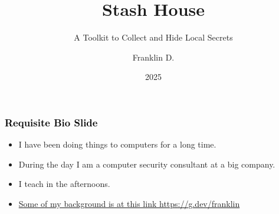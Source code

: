 \documentclass[aspectratio=169]{beamer}
\title{Stash House}
\subtitle{A Toolkit to Collect and Hide Local Secrets}
\author{Franklin D.}
\institute{Recreational Computing Institute}
\date{2025}
\makeatletter
\def\sectionsubtitle#1{\gdef\@sectionsubtitle{#1}}
\gdef\@sectionsubtitle{}
\makeatother
\begin{document}


{
\begin{frame}
	\frametitle{\textcolor{black}{Requisite Bio Slide}}
	\begin{itemize}
		\item {I have been doing things to computers for a long time.}
		\item {During the day I am a computer security consultant at a big company.}
		\item {I teach in the afternoons.}
		\item {\href{https://g.dev/franklin}{Some of my background is at this link https://g.dev/franklin}}
	\end{itemize}
\end{frame}
}

\sectionsubtitle{\textcolor{black}{The Lost Art of Keeping a Secret}}
\end{document}
